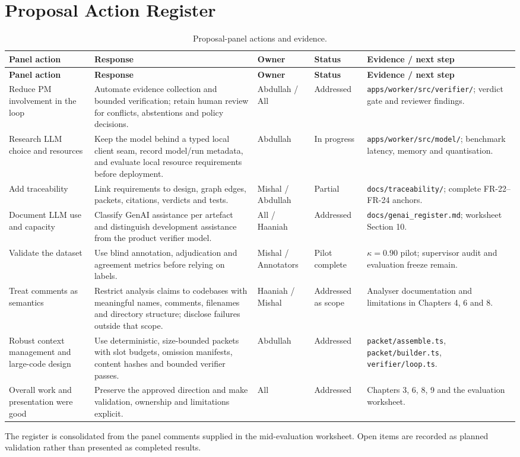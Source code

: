 \chapter{Proposal Action Register}

\begin{longtable}{>{\raggedright\arraybackslash}p{}>{\raggedright\arraybackslash}p{}>{\raggedright\arraybackslash}p{}>{\raggedright\arraybackslash}p{}>{\raggedright\arraybackslash}p{}}
\caption{Proposal-panel actions and evidence.}\label{tab:appendix-actions}\\
\toprule
\textbf{Panel action} & \textbf{Response} & \textbf{Owner} & \textbf{Status} & \textbf{Evidence / next step}\\
\midrule
\endfirsthead
\toprule
\textbf{Panel action} & \textbf{Response} & \textbf{Owner} & \textbf{Status} & \textbf{Evidence / next step}\\
\midrule
\endhead
Reduce PM involvement in the loop & Automate evidence collection and bounded verification; retain human review for conflicts, abstentions and policy decisions. & Abdullah / All & Addressed & \texttt{apps/worker/src/verifier/}; verdict gate and reviewer findings.\\
Research LLM choice and resources & Keep the model behind a typed local client seam, record model/run metadata, and evaluate local resource requirements before deployment. & Abdullah & In progress & \texttt{apps/worker/src/model/}; benchmark latency, memory and quantisation.\\
Add traceability & Link requirements to design, graph edges, packets, citations, verdicts and tests. & Mishal / Abdullah & Partial & \texttt{docs/traceability/}; complete FR-22--FR-24 anchors.\\
Document LLM use and capacity & Classify GenAI assistance per artefact and distinguish development assistance from the product verifier model. & All / Haaniah & Addressed & \texttt{docs/genai\_register.md}; worksheet Section 10.\\
Validate the dataset & Use blind annotation, adjudication and agreement metrics before relying on labels. & Mishal / Annotators & Pilot complete & $\kappa=0.90$ pilot; supervisor audit and evaluation freeze remain.\\
Treat comments as semantics & Restrict analysis claims to codebases with meaningful names, comments, filenames and directory structure; disclose failures outside that scope. & Haaniah / Mishal & Addressed as scope & Analyser documentation and limitations in Chapters 4, 6 and 8.\\
Robust context management and large-code design & Use deterministic, size-bounded packets with slot budgets, omission manifests, content hashes and bounded verifier passes. & Abdullah & Addressed & \texttt{packet/assemble.ts}, \texttt{packet/builder.ts}, \texttt{verifier/loop.ts}.\\
Overall work and presentation were good & Preserve the approved direction and make validation, ownership and limitations explicit. & All & Addressed & Chapters 3, 6, 8, 9 and the evaluation worksheet.\\
\bottomrule
\end{longtable}

\noindent The register is consolidated from the panel comments supplied in the
mid-evaluation worksheet. Open items are recorded as planned validation rather
than presented as completed results.
